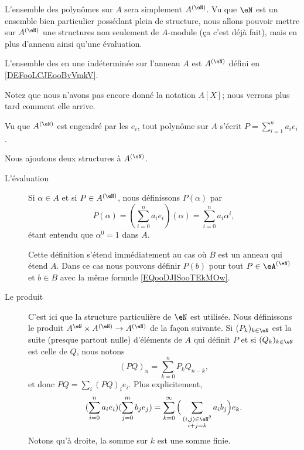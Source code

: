 L'ensemble des polynômes sur \( A\) sera simplement \( A^{(\eN)}\). Vu que \( \eN\) est un ensemble bien particulier possédant plein de structure, nous allons pouvoir mettre sur \( A^{(\eN)}\) une structures non seulement de \( A\)-module (ça c'est déjà fait), mais en plus d'anneau ainsi qu'une évaluation.
\begin{definition}      \label{DEFooFYZRooMikwEL}
    L'ensemble des  en une indéterminée sur l'anneau \( A\) est \( A^{(\eN)}\) défini en \ref{DEFooLCJEooBvVmkV}.
\end{definition}

Notez que nous n'avons pas encore donné la notation \( A[X]\); nous verrons plus tard comment elle arrive. 

Vu que \( A^{(\eN)}\) est engendré par les \( e_i\), tout polynôme sur \( A\) s'écrit \( P=\sum_{i=1}^na_ie_i\).

\begin{definition}      \label{DEFooNXKUooLrGeuh}
    Nous ajoutons deux structures à \( A^{(\eN)}\).
    \begin{description}
        \item[L'évaluation] Si \( \alpha\in A\) et si \( P\in A^{(\eN)}\), nous définissons \( P(\alpha)\) par
            \begin{equation}        \label{EQooDJISooTEkMOw}
                P(\alpha)=(\sum_{i=0}^{n}a_ie_i)(\alpha)=\sum_{i=0}^na_i\alpha^i,
            \end{equation}
            étant entendu que \( \alpha^0=1\) dans \( A\).

            Cette définition s'étend immédiatement au cas où \( B\) est un anneau qui étend \( A\). Dans ce cas nous pouvons définir \( P(b)\) pour tout \( P\in \eA^{(\eN)}\) et \( b\in B\) avec la même formule \eqref{EQooDJISooTEkMOw}.
        \item[Le produit] C'est ici que la structure particulière de \( \eN\) est utilisée. Nous définissons le produit \( A^{\eN}\times A^{(\eN)}\to A^{(\eN)}\) de la façon suivante. Si \( (P_k)_{k\in \eN}\) est la suite (presque partout nulle) d'éléments de \( A\) qui définit \( P\) et si \( (Q_k)_{k\in \eN}\) est celle de \( Q\), nous notons
        \begin{equation}    \label{EQooTNCSooKklisb}
            (PQ)_n=\sum_{k=0}^nP_kQ_{n-k},
        \end{equation}
        et donc \( PQ=\sum_i(PQ)_ie_i\). Plus explicitement,
        \begin{equation}    \label{EQooCIBUooAgpxjL}
            (\sum_{i=0}^na_ie_i)(\sum_{j=0}^mb_je_j)=\sum_{k=0}^{\infty}\Big( \sum_{\substack{  (i,j)\in \eN^2 \\i+j=k}}a_ib_j \Big)e_k.
        \end{equation}
        Notons qu'à droite, la somme sur \( k\) est une somme finie.
    \end{description}
\end{definition}

